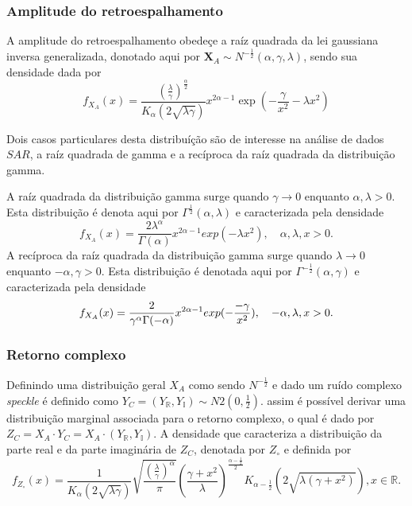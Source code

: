\documentclass[12pt,a4paper]{article}
\begin{document}
\subsubsection{Amplitude do retroespalhamento}

A amplitude do retroespalhamento obedeçe a raíz quadrada da lei gaussiana inversa generalizada, donotado aqui por $\mathbf{X}_{A}\sim N^{-\frac{1}{2}}(\alpha,\gamma,\lambda)$, sendo sua densidade dada por
\begin{equation}\label{eqn104}
	f_{X_{A}}(x)=\frac{\left(\frac{\lambda}{\gamma}\right)^{\frac{\alpha}{2}}}{K_{\alpha}(2\sqrt{\lambda\gamma})}x^{2\alpha-1}\exp\left(-\frac{\gamma}{x^2}-\lambda x^2\right) 
\end{equation}

Dois casos particulares desta distribuíção são de interesse na análise de dados $SAR$, a raíz quadrada de gamma e a recíproca da raíz quadrada da distribuição gamma. 

A raíz quadrada da distribuição gamma surge quando $\gamma \rightarrow 0$ enquanto $\alpha,\lambda>0$. Esta distribuição é denota aqui por $\Gamma^{\frac{1}{2}}(\alpha,\lambda)$ e caracterizada pela densidade 
\begin{equation}\label{eqn105}
	f_{X_{A}}(x)=\frac{2\lambda^{\alpha}}{\Gamma(\alpha)}x^{2\alpha-1}exp(-\lambda x^2), \quad \alpha,\lambda, x>0. 
\end{equation}
A recíproca da raíz quadrada da distribuição gamma surge quando $\lambda\rightarrow 0$ enquanto $-\alpha,\gamma>0$. Esta distribuição é denotada aqui por $\Gamma^{-\frac{1}{2}}(\alpha,\gamma) $ e caracterizada pela densidade
\begin{equation}\label{eqn106}
	f_{X_{A}}(x)=\frac{2}{\gamma^{\alpha}\Gamma(-\alpha)}x^{2\alpha-1}exp(-\frac{-\gamma}{x^2}), \quad -\alpha,\lambda, x>0. \\
\end{equation}

\subsubsection{Retorno complexo}

Definindo uma distribuição geral $X_{A}$ como sendo $N^{-\frac{1}{2}}$ e dado um ruído complexo {\it speckle} é definido como $Y_{C}=(Y_{\mathbb{R}},Y_{\mathbb{I}})\sim N2(0,\frac{1}{2})$. assim é possível derivar uma distribuição marginal associada para o retorno complexo, o qual é dado por $Z_{C}=X_{A}\cdot Y_{C}=X_{
A}\cdot(Y_{\mathbb{R}},Y_{\mathbb{I}})$. A densidade que caracteriza a distribuição da parte real e da parte imaginária de $Z_{C}$, denotada por $Z_{\circ}$ e definida por
\begin{equation}\label{eqn107}
	f_{Z_{\circ}}(x)=\frac{1}{K_{\alpha}(2\sqrt{\lambda\gamma})}\sqrt{\frac{\left(\frac{\lambda}{\gamma} \right)^{\alpha}}{\pi}}\left(\frac{\gamma+x^2}{\lambda} \right)^{\frac{\alpha-\frac{1}{2}}{2}}K_{\alpha-\frac{1}{2}}\left(2\sqrt{\lambda(\gamma+x^2)}\right), x\in\mathbb{R}. 
\end{equation}
\end{document}
